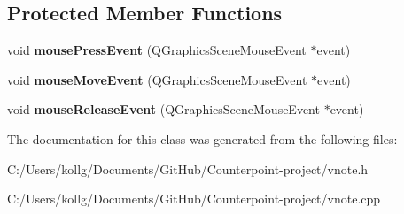 \subsection*{Protected Member Functions}
\begin{DoxyCompactItemize}
\item 
\hypertarget{class_v_note_ae584af522ce182ec7919b0802e2aaf6b}{}void {\bfseries mouse\+Press\+Event} (Q\+Graphics\+Scene\+Mouse\+Event $\ast$event)\label{class_v_note_ae584af522ce182ec7919b0802e2aaf6b}

\item 
\hypertarget{class_v_note_aef4d0e27761e5a423fca0befd1e118e0}{}void {\bfseries mouse\+Move\+Event} (Q\+Graphics\+Scene\+Mouse\+Event $\ast$event)\label{class_v_note_aef4d0e27761e5a423fca0befd1e118e0}

\item 
\hypertarget{class_v_note_a2335dbb188102ea316bbc79609f8e2fb}{}void {\bfseries mouse\+Release\+Event} (Q\+Graphics\+Scene\+Mouse\+Event $\ast$event)\label{class_v_note_a2335dbb188102ea316bbc79609f8e2fb}

\end{DoxyCompactItemize}


The documentation for this class was generated from the following files\+:\begin{DoxyCompactItemize}
\item 
C\+:/\+Users/kollg/\+Documents/\+Git\+Hub/\+Counterpoint-\/project/vnote.\+h\item 
C\+:/\+Users/kollg/\+Documents/\+Git\+Hub/\+Counterpoint-\/project/vnote.\+cpp\end{DoxyCompactItemize}
